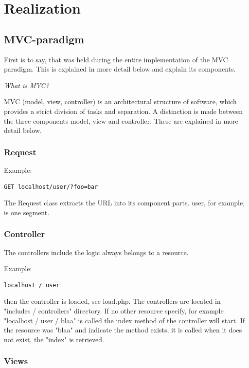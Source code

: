 \documentclass[a4paper,12pt,oneside]{article} %
\begin{document}
\section{Realization}


\subsection{MVC-paradigm}

First is to say, that was held during the entire implementation of
the MVC paradigm. This is explained in more detail below and explain
its components. 

\emph{What is MVC? }

MVC (model, view, controller) is an architectural structure of software,
which provides a strict division of tasks and separation. A distinction
is made between the three components model, view and controller. These
are explained in more detail below.


\subsubsection*{Request}

Example: 
\begin{lstlisting}
GET localhost/user/?foo=bar
\end{lstlisting}

 The Request class extracts the URL into its component parts. user,
for example, is one segment.


\subsubsection*{Controller}

The controllers include the logic always belongs to a resource. 

Example: 

\begin{lstlisting}
localhost / user
\end{lstlisting}
then the controller is loaded, see load.php. The controllers are
located in "includes / controllers" directory. If no other resource
specify, for example "localhost / user / blaa"
 is called the index method of the controller will start. If the resource was
"blaa" and indicate the method exists, it is called when it does not
exist, the "index" is retrieved.


\subsubsection*{Views}
\end{document}
